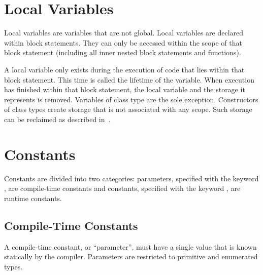 \section{Local Variables}
\label{Local_Variables}

Local variables are variables that are not global.  Local variables
are declared within block statements.  They can only be accessed
within the scope of that block statement (including all inner nested
block statements and functions).

A local variable only exists during the execution of code that lies
within that block statement.  This time is called the lifetime of the
variable.  When execution has finished within that block statement,
the local variable and the storage it represents is removed.
Variables of class type are the sole exception.  Constructors of class
types create storage that is not associated with any scope.  Such
storage can be reclaimed as described
in~.

\section{Constants}
\label{Constants}

Constants are divided into two categories: parameters, specified with
the keyword , are compile-time constants and constants,
specified with the keyword , are runtime constants.

\subsection{Compile-Time Constants}
\label{Compile-Time_Constants}

A compile-time constant, or ``parameter'', must have a single value that is
known statically by the compiler.  Parameters are restricted to
primitive and enumerated types.

